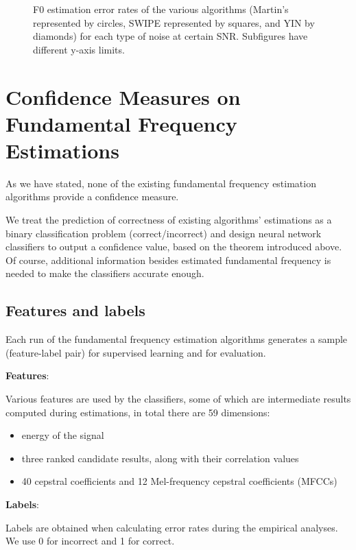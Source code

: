 \documentclass[11pt,a4paper]{report}
\begin{document}
\begin{figure}[htbp]
  \caption[F0 estimation error rates of the various algorithms for each type of noise at certain SNR.]{F0 estimation error rates of the various algorithms (Martin's represented by circles, SWIPE represented by squares, and YIN by diamonds) for each type of noise at certain SNR\@.
    Subfigures have different y-axis limits.}
  \label{fig:random-noise-snr-same-audio}
\end{figure}

\chapter{Confidence Measures on Fundamental Frequency Estimations}

As we have stated, none of the existing fundamental frequency estimation algorithms provide a confidence measure.

We treat the prediction of correctness of existing algorithms' estimations as a binary classification problem (correct/incorrect) and design neural network classifiers to output a confidence value, based on the theorem introduced above.
Of course, additional information besides estimated fundamental frequency is needed to make the classifiers accurate enough.

\section{Features and labels}

Each run of the fundamental frequency estimation algorithms generates a sample (feature-label pair) for supervised learning and for evaluation.

\begin{mdframed}
\noindent \textbf{Features}:

Various features are used by the classifiers, some of which are intermediate results computed during estimations, in total there are 59 dimensions:

\begin{itemize}
  \item energy of the signal
  \item three ranked candidate results, along with their correlation values
  \item 40 cepstral coefficients and 12 Mel-frequency cepstral coefficients (MFCCs) \parencite{mermelstein1976distance,davis1980comparison}
\end{itemize}

\noindent \textbf{Labels}:

Labels are obtained when calculating error rates during the empirical analyses.
We use 0 for incorrect and 1 for correct.
\end{mdframed}
\end{document}
